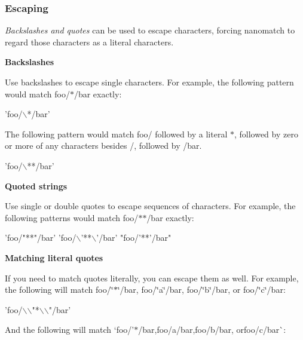 \subsubsection*{Escaping}

{\itshape Backslashes and quotes} can be used to escape characters, forcing nanomatch to regard those characters as a literal characters.

{\bfseries Backslashes}

Use backslashes to escape single characters. For example, the following pattern would match {\ttfamily foo/$\ast$/bar} exactly\+:


\begin{DoxyCode}
'foo/\(\backslash\)*/bar'
\end{DoxyCode}


The following pattern would match {\ttfamily foo/} followed by a literal {\ttfamily $\ast$}, followed by zero or more of any characters besides {\ttfamily /}, followed by {\ttfamily /bar}.


\begin{DoxyCode}
'foo/\(\backslash\)**/bar'
\end{DoxyCode}


{\bfseries Quoted strings}

Use single or double quotes to escape sequences of characters. For example, the following patterns would match {\ttfamily foo/$\ast$$\ast$/bar} exactly\+:


\begin{DoxyCode}
'foo/"**"/bar'
'foo/\(\backslash\)'**\(\backslash\)'/bar'
"foo/'**'/bar"
\end{DoxyCode}


{\bfseries Matching literal quotes}

If you need to match quotes literally, you can escape them as well. For example, the following will match {\ttfamily foo/\char`\"{}$\ast$\char`\"{}/bar}, {\ttfamily foo/\char`\"{}a\char`\"{}/bar}, {\ttfamily foo/\char`\"{}b\char`\"{}/bar}, or {\ttfamily foo/\char`\"{}c\char`\"{}/bar}\+:


\begin{DoxyCode}
'foo/\(\backslash\)\(\backslash\)"*\(\backslash\)\(\backslash\)"/bar'
\end{DoxyCode}


And the following will match `foo/'$\ast$\textquotesingle{}/bar{\ttfamily ,}foo/\textquotesingle{}a\textquotesingle{}/bar{\ttfamily ,}foo/\textquotesingle{}b\textquotesingle{}/bar{\ttfamily , or}foo/\textquotesingle{}c\textquotesingle{}/bar\`{}\+:


